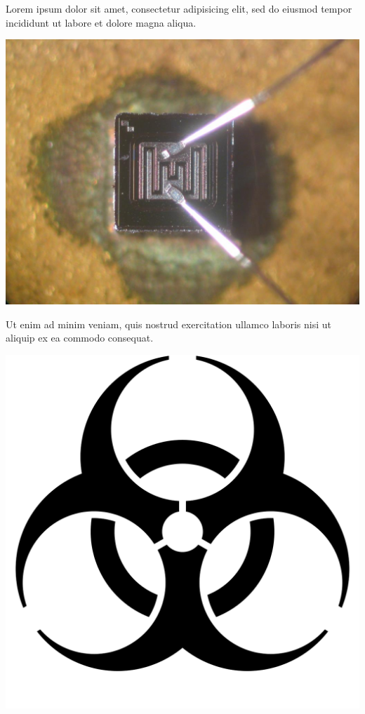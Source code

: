 {
Lorem ipsum dolor sit amet, consectetur adipisicing elit, sed do eiusmod tempor incididunt ut labore et dolore magna aliqua.

\begin{center}
\includegraphics[scale=0.1]{pic/transistor}
\end{center}

Ut enim ad minim veniam, quis nostrud exercitation ullamco laboris nisi ut aliquip ex ea commodo consequat.
}


{
\begin{center}
\includegraphics[scale=0.5]{svg/biohazard}
\end{center}
}


